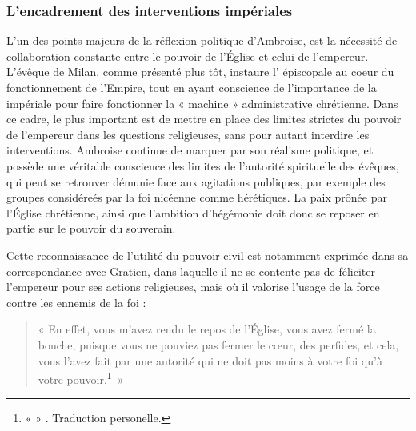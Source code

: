 \bigskip

\subsubsection{L'encadrement des interventions impériales}

L'un des points majeurs de la réflexion politique d'Ambroise, est la nécessité de collaboration constante entre le pouvoir de l'Église et celui de l'empereur. L'évêque de Milan, comme présenté plus tôt, instaure l' épiscopale au coeur du fonctionnement de l'Empire, tout en ayant conscience de l'importance de la  impériale pour faire fonctionner la « machine » administrative chrétienne. Dans ce cadre, le plus important est de mettre en place des limites strictes du pouvoir de l'empereur dans les questions religieuses, sans pour autant interdire les interventions. Ambroise continue de marquer par son réalisme politique, et possède une véritable conscience des limites de l'autorité spirituelle des évêques, qui peut se retrouver démunie face aux agitations publiques, par exemple des groupes considéreés par la foi nicéenne comme hérétiques. La paix prônée par l'Église chrétienne, ainsi que l'ambition d'hégémonie doit donc se reposer en partie sur le pouvoir du souverain.

\bigskip

Cette reconnaissance de l'utilité du pouvoir civil est notamment exprimée dans sa correspondance avec Gratien, dans laquelle il ne se contente pas de féliciter l'empereur pour ses actions religieuses, mais où il valorise l'usage de la force contre les ennemis de la foi :

\bigskip

\begin{quote}
    « En effet, vous m'avez rendu le repos de l'Église, vous avez fermé la bouche, puisque vous ne pouviez pas fermer le cœur, des perfides, et cela, vous l'avez fait par une autorité qui ne doit pas moins à votre foi qu'à votre pouvoir.\footnote{«  » \cite[\nopp ec. 12, 2]{ambroise_csel_82_3}. {Traduction personelle.}}~»
\end{quote}

\bigskip

